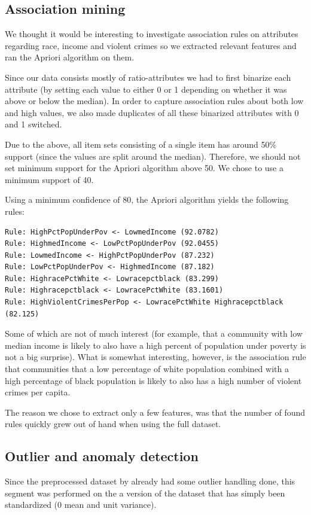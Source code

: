 \documentclass[a4paper,10pt]{article}
\begin{document}
\subsection{Association mining}
We thought it would be interesting to investigate association rules on attributes regarding race, income and violent crimes so we extracted relevant features and ran the Apriori algorithm on them.

Since our data consists mostly of ratio-attributes we had to first binarize each attribute (by setting each value to either 0 or 1 depending on whether it was above or below the median). In order to capture association rules about both low and high values, we also made duplicates of all these binarized attributes with 0 and 1 switched.

Due to the above, all item sets consisting of a single item has around 50\% support (since the values are split around the median). Therefore, we should not set minimum support for the Apriori algorithm above 50. We chose to use a minimum support of 40.

Using a minimum confidence of 80, the Apriori algorithm yields the following rules:
\begin{verbatim}
Rule: HighPctPopUnderPov <- LowmedIncome (92.0782)
Rule: HighmedIncome <- LowPctPopUnderPov (92.0455)
Rule: LowmedIncome <- HighPctPopUnderPov (87.232)
Rule: LowPctPopUnderPov <- HighmedIncome (87.182)
Rule: HighracePctWhite <- Lowracepctblack (83.299)
Rule: Highracepctblack <- LowracePctWhite (83.1601)
Rule: HighViolentCrimesPerPop <- LowracePctWhite Highracepctblack (82.125)
\end{verbatim}
Some of which are not of much interest (for example, that a community with low median income is likely to also have a high percent of population under poverty is not a big surprise). What is somewhat interesting, however, is the association rule that communities that a low percentage of white population combined with a high percentage of black population is likely to also has a high number of violent crimes per capita.

The reason we chose to extract only a few features, was that the number of found rules quickly grew out of hand when using the full dataset.



\subsection{Outlier and anomaly detection}
Since the preprocessed dataset by \cite{redmond09} already had some outlier handling done, this segment was performed on the a version of the dataset that has simply been standardized (0 mean and unit variance).
\end{document}
